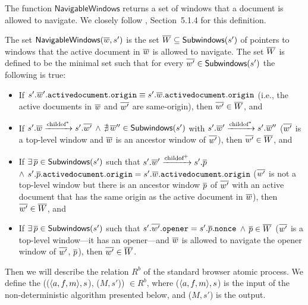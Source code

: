 The function $\mathsf{NavigableWindows}$ returns a set of
windows that a document is allowed to navigate. We closely
follow \cite{html5}, Section~5.1.4 for this definition.
\begin{definition} The set $\mathsf{NavigableWindows}(\overline{w}, s')$
  is the set $\overline{W} \subseteq
  \mathsf{Subwindows}(s')$ of pointers to windows that the
  active document in $\overline{w}$ is allowed to navigate. The
  set $\overline{W}$ is defined to be the minimal set such that
  for every $\overline{w'}
  \in \mathsf{Subwindows}(s')$ the following is true: %
\begin{itemize}
\item If
  ${{{s'}.\overline{w}'}.\mathtt{activedocument}}.\mathtt{origin}
  \equiv
  {{{s'}.\overline{w}}.\mathtt{activedocument}}.\mathtt{origin}$
  (i.e., the active documents in $\overline{w}$ and $\overline{w'}$ are
  same-origin), then $\overline{w'} \in \overline{W}$, and
\item If ${{s'}.\overline{w} \xrightarrow{\text{childof}^*}
    {s'}.\overline{w'}}$ $\wedge$ $\nexists\, \overline{w}''
  \in \mathsf{Subwindows}(s')$ with ${s'}.\overline{w}'
  \xrightarrow{\text{childof}^*} {s'}.\overline{w}''$ ($\overline{w'}$ is a
  top-level window and $\overline{w}$ is an ancestor window of
  $\overline{w'}$), then $\overline{w'} \in \overline{W}$, and
\item If $\exists\, \overline{p} \in \mathsf{Subwindows}(s')$
  such that ${s'}.\overline{w}' \xrightarrow{\text{childof}^+}
  {s'}.\overline{p}$ \\$\wedge$
  ${{{s'}.\overline{p}}.\mathtt{activedocument}}.\mathtt{origin}
  =
  {{{s'}.\overline{w}}.\mathtt{activedocument}}.\mathtt{origin}$
  ($\overline{w'}$ is not a top-level window but there is an
  ancestor window $\overline{p}$ of $\overline{w'}$ with an active
  document that has the same origin as the active document
  in $\overline{w}$), then $\overline{w'} \in \overline{W}$, and
\item If $\exists\, \overline{p} \in \mathsf{Subwindows}(s')$ such
  that ${{s'}.\overline{w'}}.\mathtt{opener} =
  {{s'}.\overline{p}}.\mathtt{nonce}$ $\wedge$ $\overline{p} \in
  \overline{W}$ ($\overline{w'}$ is a top-level window---it has an
  opener---and $\overline{w}$ is allowed to navigate the opener
  window of $\overline{w'}$, $\overline{p}$), then $\overline{w'} \in
  \overline{W}$. 
\end{itemize}
\end{definition}

Then we will describe the relation $R^b$ of the standard browser atomic process.  
We define the (($\langle a, f, m\rangle, s$), ($M, s'$)) $\in R^b$, where ($\langle a, f, m\rangle, s$) is the input of the non-deterministic algorithm presented below, and ($M, s'$) is the output.

